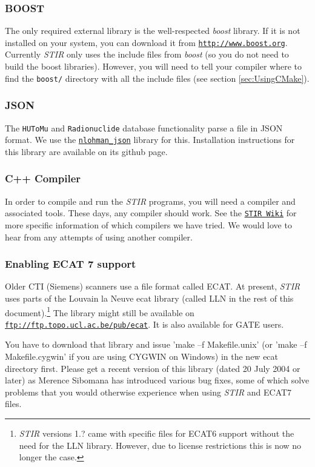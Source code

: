 \documentclass{article}
\def\url#1#2{\mbox{\href{#1}{\tt #2}}}
\begin{document}
\subsubsection{BOOST}
The only required external library is the well-respected \textit{boost} library. If it
is not installed on your system, you can download it from 
\url{http://www.boost.org}{http://www.boost.org}. Currently \textit{STIR} only
uses the include files from \textit{boost} (so you do not need to build
the boost libraries). However, you will need to tell your compiler
where to find the \texttt{boost/} directory with all the include files
(see section \ref{sec:UsingCMake}).

\subsubsection{JSON}
The \texttt{HUToMu} and \texttt{Radionuclide} database functionality parse a file in JSON format. We use the
\url{https://github.com/nlohmann/json}{nlohman\_json} library for this. Installation
instructions for this library are available on its github page.

\subsubsection{
C++ Compiler}

In order to compile and run the \textit{STIR} programs, you will need a compiler
and associated tools. These days, any compiler should work. See the 
\url{http://sourceforge.net/stir}{STIR Wiki} for more
specific information of which compilers we have tried.
We would love 
to hear from any attempts of using another compiler. 

\subsubsection{
Enabling ECAT 7 support}
\label{sec:ECAT67support}
Older CTI (Siemens) scanners use a file format called ECAT\texttrademark{}.
At present, \textit{STIR} uses parts of the Louvain la Neuve ecat library (called LLN in
the rest of this document).\footnote{\textit{STIR} versions 1.? came with
specific files for ECAT6 support without the need for the LLN library. 
However, due to license restrictions this is now no longer the case.} 
The library might still be available on  
\url{ftp://ftp.topo.ucl.ac.be/pub/ecat }{ftp://ftp.topo.ucl.ac.be/pub/ecat}.
It is also available for GATE users.

You have to download that library and issue 'make --f Makefile.unix' 
(or 'make --f Makefile.cygwin' if you are using CYGWIN on Windows) 
in the new ecat directory first. Please get a recent version 
of this library (dated 20 July 2004 or later) as Merence Sibomana 
has introduced various bug fixes, some of which solve problems 
that you would otherwise experience when using \textit{STIR} and ECAT7 
files.
\end{document}
